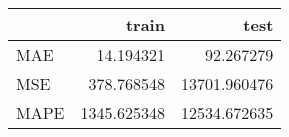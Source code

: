 \begin{tabular}{lrr}
\toprule
{} &        train &          test \\
\midrule
MAE  &    14.194321 &     92.267279 \\
MSE  &   378.768548 &  13701.960476 \\
MAPE &  1345.625348 &  12534.672635 \\
\bottomrule
\end{tabular}
